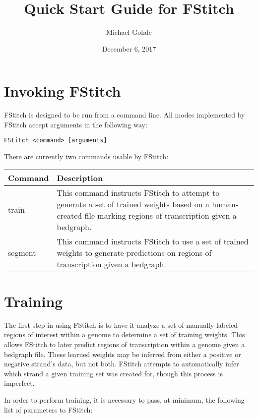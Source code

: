 \documentclass[12pt,letterpaper]{article}
\begin{document}
\title{Quick Start Guide for FStitch}
\author{Michael Gohde}
\date{December 6, 2017}
\maketitle


\section{Invoking FStitch}
FStitch is designed to be run from a command line. All modes implemented by FStitch accept arguments in the following way:

\begin{verbatim}
FStitch <command> [arguments]
\end{verbatim}

There are currently two commands usable by FStitch:

\begin{tabular}{| l | p{8cm} |}
 \hline
 \textbf{Command} & \textbf{Description}\\
 \hline
 train & This command instructs FStitch to attempt to generate a set of trained weights based on a human-created file marking regions of transcription given a bedgraph.\\
 \hline
 segment & This command instructs FStitch to use a set of trained weights to generate predictions on regions of transcription given a bedgraph.\\
 \hline
\end{tabular}

\section{Training}
The first step in using FStitch is to have it analyze a set of manually labeled regions of interest within a genome to determine a set of training weights.
This allows FStitch to later predict regions of transcription within a genome given a bedgraph file. These learned weights may be inferred from either a positive
or negative strand's data, but not both. FStitch attempts to automatically infer which strand a given training set was created for, though this process is imperfect.

In order to perform training, it is necessary to pass, at minimum,
the following list of parameters to FStitch:
\end{document}
